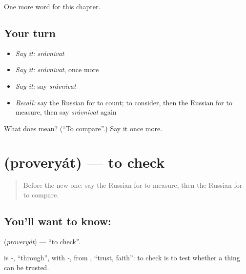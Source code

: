 \begin{grammarlens}[title={What you've built}]
One more word for this chapter.
\end{grammarlens}

\subsection*{Your turn}
\begin{itemize}
\raggedright
  \item \emph{Say it:} \emph{srávnivat}
  \item \emph{Say it:} \emph{srávnivat}, once more
  \item \emph{Say it:} say \emph{srávnivat}
  \item \emph{Recall:} say the Russian for to count; to consider, then the Russian for to measure, then say \emph{srávnivat} again
\end{itemize}

\begin{tcolorbox}[breakable,colback=teal!4,colframe=teal!35!black,title={Before you move on}]
What does  mean? (\textquotedblleft{}To compare\textquotedblright{}.) Say it once more.
\end{tcolorbox}
\section[\texorpdfstring{\ru{проверять} (proveryát)}{проверять (proveryát)}]{ (proveryát) — to check}

\label{lesson:RU-C236-proveryat}



\begin{quote}
Before the new one: say the Russian for to measure, then the Russian for to compare.
\end{quote}

\subsection*{You'll want to know: }
\textbf{} (\emph{proveryát}) — \textquotedblleft{}to check\textquotedblright{}.

\begin{cousinweb}
\textbf{} is \emph{-}, \textquotedblleft{}through\textquotedblright{}, with \emph{-}, from \emph{}, \textquotedblleft{}trust, faith\textquotedblright{}: to check is to test whether a thing can be trusted.
\end{cousinweb}

